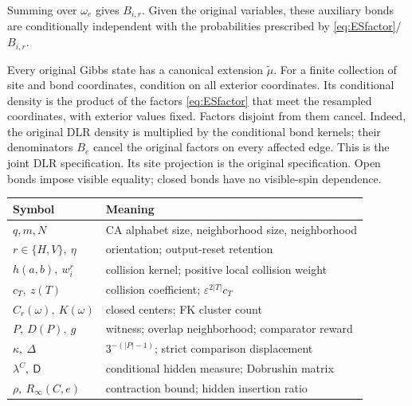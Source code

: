 Summing over \(\omega_e\) gives \(B_{i,r}\). Given the original variables, these auxiliary bonds are conditionally independent with the probabilities prescribed by \eqref{eq:ESfactor}/\(B_{i,r}\).

Every original Gibbs state has a canonical extension $\widetilde\mu$. For a finite collection of site and bond coordinates, condition on all exterior coordinates. Its conditional density is the product of the factors \eqref{eq:ESfactor} that meet the resampled coordinates, with exterior values fixed. Factors disjoint from them cancel. Indeed, the original DLR density is multiplied by the conditional bond kernels; their denominators $B_e$ cancel the original factors on every affected edge. This is the joint DLR specification. Its site projection is the original specification. Open bonds impose visible equality; closed bonds have no visible-spin dependence.

\begin{center}\small
\begin{tabular}{@{}ll@{}}\toprule
Symbol & Meaning\\\midrule
$q,m,N$ & CA alphabet size, neighborhood size, neighborhood\\
$r\in\{H,V\},\ \eta$ & orientation; output-reset retention\\
$h(a,b),\ w_i^r$ & collision kernel; positive local collision weight\\
$c_T,\ z(T)$ & collision coefficient; $\varepsilon^{2|T|}c_T$\\
$C_r(\omega),\ K(\omega)$ & closed centers; FK cluster count\\
$P,\ D(P),\ g$ & witness; overlap neighborhood; comparator reward\\
$\kappa,\ \Delta$ & $3^{-(|P|-1)}$; strict comparison displacement\\
$\lambda^C,\ \mathsf D$ & conditional hidden measure; Dobrushin matrix\\
$\rho,\ R_\infty(C,e)$ & contraction bound; hidden insertion ratio\\\bottomrule
\end{tabular}
\end{center}

